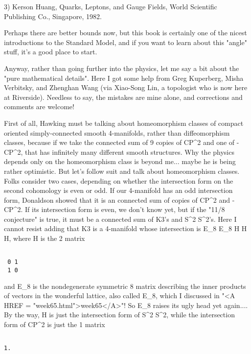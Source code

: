 3) Kerson Huang, Quarks, Leptons, and Gauge Fields, World Scientific
Publishing Co., Singapore, 1982.  

Perhaps there are better bounds now, but this book is certainly one of
the nicest introductions to the Standard Model, and if you want to 
learn about this "\theta  angle" stuff, it's a good place to start.

Anyway, rather than going further into the physics, let me say a bit
about the "pure mathematical details".  Here I got some help from
Greg Kuperberg, Misha Verbitsky, and Zhenghan Wang (via Xiao-Song Lin, a
topologist who is now here at Riverside).  Needless to say, the mistakes
are mine alone, and corrections and comments are welcome!

First of all, Hawking must be talking about homeomorphism classes of
compact oriented simply-connected smooth 4-manifolds, rather than
diffeomorphism classes, because if we take the connected sum of 9
copies of CP^{2} and one of -CP^{2}, that has
infinitely many different smooth structures.  Why the physics depends
only on the homeomorphism class is beyond me... maybe he is being
rather optimistic.  But let's follow suit and talk about homeomorphism
classes.  Folks consider two cases, depending on whether the
intersection form on the second cohomology is even or odd.  If our
4-manifold has an odd intersection form, Donaldson showed that it is
an connected sum of copies of CP^{2} and -CP^{2}.  If
its intersection form is even, we don't know yet, but if the "11/8
conjecture" is true, it must be a connected sum of K3's and
S^{2} \times  S^{2}'s.  Here I cannot resist adding
that K3 is a 4-manifold whose intersection is E_{8} \oplus 
E_{8} \oplus  H \oplus  H \oplus  H, where H is the 2 matrix


\begin{verbatim}

 0 1
 1 0
\end{verbatim}
    

and E_{8} is the nondegenerate symmetric 8 matrix describing
the inner products of vectors in the wonderful lattice, also called
E_{8}, which I discussed in "<A HREF =
"week65.html">week65</A>"!  So E_{8} raises its ugly head yet
again....  By the way, H is just the intersection form of
S^{2} \times  S^{2}, while the intersection form of
CP^{2} is just the 1 matrix


\begin{verbatim}

1.
\end{verbatim}
    


